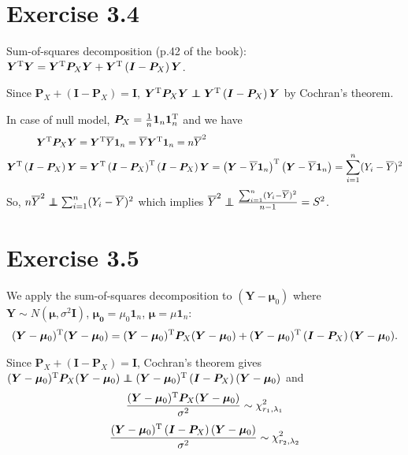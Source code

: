\documentclass[a4paper]{article}
\newcommand\independent{\protect\mathpalette{\protect\independenT}{\perp}}
\def\independenT#1#2{\mathrel{\rlap{$#1#2$}\mkern2mu{#1#2}}}
\begin{document}
\vspace{\baselineskip}
\section{Exercise 3.4}
Sum-of-squares decomposition (p.42 of the book): $\bm{Y}^{\rm T}\bm{Y} = \bm{Y}^{\rm T}\bm{P}_{X}\bm{Y} + \bm{Y}^{\rm T}\left(\bm{I} - \bm{P}_{X} \right)\bm{Y}$.

Since $\bm{P}_{X} + (\bm{I} -\bm{P}_{X}) = \bm{I}$, $\bm{Y}^{\rm T}\bm{P}_{X}\bm{Y} \independent \bm{Y}^{\rm T}\left(\bm{I} - \bm{P}_{X}\right)\bm{Y}$ by Cochran's theorem.

In case of null model, $\bm{P}_{X} = \frac{1}{n}\bm{1}_{n}\bm{1}_{n}^{\rm T}$ and we have
\begin{align*}
\bm{Y}^{\rm T}\bm{P}_{X}\bm{Y} &= \bm{Y}^{\rm T}\overline{Y}\bm{1}_{n} = \overline{Y}\bm{Y}^{\rm T}\bm{1}_{n} = n\overline{Y}^2\\
\bm{Y}^{\rm T}\left(\bm{I} - \bm{P}_{X}\right)\bm{Y} &= \bm{Y}^{\rm T}\left(\bm{I} - \bm{P}_{X}\right)^{\rm T}\left(\bm{I} - \bm{P}_{X}\right)\bm{Y} = \left(\bm{Y} - \overline{Y}\bm{1}_{n}\right)^{\rm T}\left(\bm{Y} - \overline{Y}\bm{1}_{n}\right) = \sum_{i=1}^{n} (Y_{i} - \overline{Y})^{2}
\end{align*}
So, $n\overline{Y}^2 \independent \sum_{i=1}^{n} (Y_{i} - \overline{Y})^{2}$ which implies  $\overline{Y}^2 \independent \frac{\sum_{i=1}^{n} (Y_{i} - \overline{Y})^{2}}{n-1} = S^2$.


\vspace{\baselineskip}
\section{Exercise 3.5}
We apply the sum-of-squares decomposition to $(\bm{Y} - \bm{\mu}_{0})$ where $\bm{Y} \sim N(\bm{\mu}, \sigma^2 \bm{I})$, $\bm{\mu_{0}} = \mu_{0}\bm{1}_{n}$, $\bm{\mu} = \mu\bm{1}_{n}$:
\begin{align*}
(\bm{Y} - \bm{\mu}_{0})^{\rm T}(\bm{Y} - \bm{\mu}_{0}) = (\bm{Y} - \bm{\mu}_{0})^{\rm T}\bm{P}_{X}(\bm{Y} - \bm{\mu}_{0}) + (\bm{Y} - \bm{\mu}_{0})^{\rm T}\left(\bm{I} - \bm{P}_{X} \right)(\bm{Y} - \bm{\mu}_{0}).
\end{align*}

Since $\bm{P}_{X} + (\bm{I} -\bm{P}_{X}) = \bm{I}$, Cochran's theorem gives $(\bm{Y} - \bm{\mu}_{0})^{\rm T}\bm{P}_{X}(\bm{Y} - \bm{\mu}_{0}) \independent (\bm{Y} - \bm{\mu}_{0})^{\rm T}\left(\bm{I} - \bm{P}_{X} \right)(\bm{Y} - \bm{\mu}_{0})$ and
\begin{align*}
\frac{(\bm{Y} - \bm{\mu}_{0})^{\rm T}\bm{P}_{X}(\bm{Y} - \bm{\mu}_{0})}{\sigma^2} \sim \chi_{r_{1}, \lambda_{1}}^2
\end{align*}
\begin{align*}
\frac{(\bm{Y} - \bm{\mu}_{0})^{\rm T}\left(\bm{I} - \bm{P}_{X} \right)(\bm{Y} - \bm{\mu}_{0})}{\sigma^2} \sim \chi_{r_{2}, \lambda_{2}}^2
\end{align*}
\end{document}
